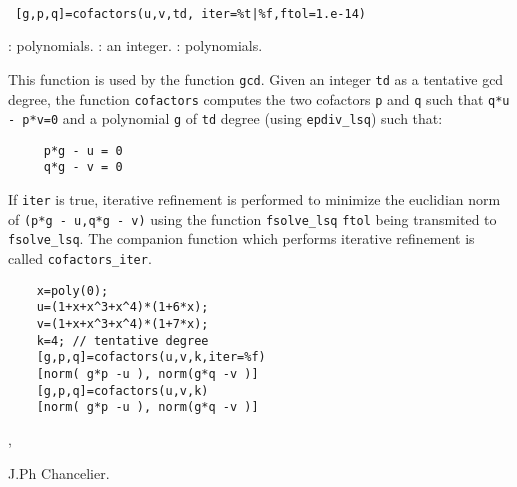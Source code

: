 \begin{mandesc}
  \\ %
\end{mandesc}
\begin{calling_sequence}
\begin{verbatim}
 [g,p,q]=cofactors(u,v,td, iter=%t|%f,ftol=1.e-14)   
\end{verbatim}
\end{calling_sequence}
\begin{parameters}
  \begin{varlist}
    : polynomials. 
    : an integer. 
    : polynomials.
  \end{varlist}
\end{parameters}
\begin{mandescription}
  This function is used by the function \verb+gcd+. 
  Given an integer \verb+td+ as a tentative gcd degree, the function \verb+cofactors+ 
  computes the two cofactors \verb+p+ and \verb+q+ such that \verb+q*u - p*v=0+ and a 
  polynomial \verb+g+ of \verb+td+ degree (using \verb+epdiv_lsq+) such that:
\begin{verbatim}
     p*g - u = 0 
     q*g - v = 0
\end{verbatim} 
  If \verb+iter+ is true, iterative refinement is performed to minimize the euclidian 
  norm of \verb+(p*g - u,q*g - v)+ using the function \verb+fsolve_lsq+ \verb+ftol+ 
  being transmited to \verb+fsolve_lsq+. The 
  companion function which performs iterative refinement is called 
  \verb+cofactors_iter+. 
\end{mandescription}
\begin{examples}
  \begin{Verbatim}
    x=poly(0);
    u=(1+x+x^3+x^4)*(1+6*x);
    v=(1+x+x^3+x^4)*(1+7*x);
    k=4; // tentative degree 
    [g,p,q]=cofactors(u,v,k,iter=%f)
    [norm( g*p -u ), norm(g*q -v )]
    [g,p,q]=cofactors(u,v,k)
    [norm( g*p -u ), norm(g*q -v )]
  \end{Verbatim}
\end{examples}
\begin{manseealso}
  , 
\end{manseealso}
\begin{authors}
  J.Ph Chancelier. 
\end{authors}


